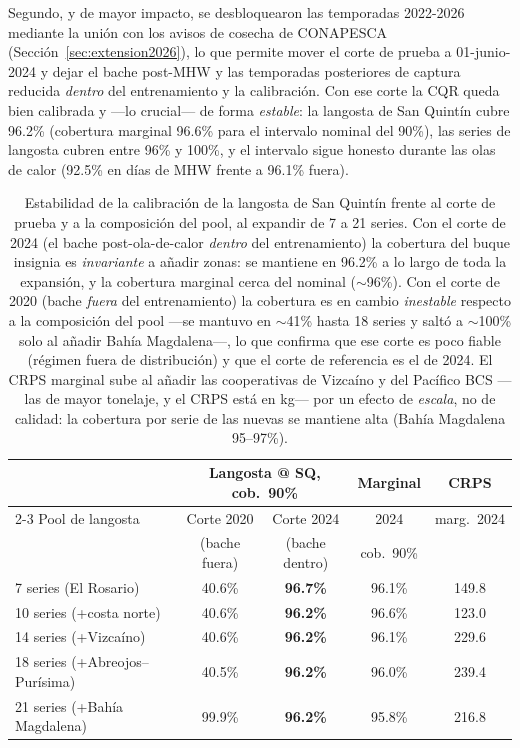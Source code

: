 \documentclass[twoside,11pt]{article}
\begin{document}
Segundo, y de mayor impacto, se desbloquearon las temporadas 2022-2026 mediante la unión con los avisos de cosecha de CONAPESCA (Sección~\ref{sec:extension2026}), lo que permite mover el corte de prueba a 01-junio-2024 y dejar el bache post-MHW y las temporadas posteriores de captura reducida \emph{dentro} del entrenamiento y la calibración. Con ese corte la CQR queda bien calibrada y ---lo crucial--- de forma \emph{estable}: la langosta de San Quintín cubre 96.2\% (cobertura marginal 96.6\% para el intervalo nominal del 90\%), las series de langosta cubren entre 96\% y 100\%, y el intervalo sigue honesto durante las olas de calor (92.5\% en días de MHW frente a 96.1\% fuera).

\begin{table}[htbp]
\centering
\small
\begin{tabular}{p{4.6cm}cccc}
\toprule
 & \multicolumn{2}{c}{Langosta @ SQ, cob.\ 90\%} & Marginal & CRPS \\
\cmidrule(lr){2-3}
Pool de langosta & Corte 2020 & Corte 2024 & 2024 & marg.\ 2024 \\
 & (bache fuera) & (bache dentro) & cob.\ 90\% & \\
\midrule
7 series (El Rosario) & 40.6\% & \textbf{96.7\%} & 96.1\% & 149.8 \\
10 series (+costa norte) & 40.6\% & \textbf{96.2\%} & 96.6\% & 123.0 \\
14 series (+Vizcaíno) & 40.6\% & \textbf{96.2\%} & 96.1\% & 229.6 \\
18 series (+Abreojos--Purísima) & 40.5\% & \textbf{96.2\%} & 96.0\% & 239.4 \\
21 series (+Bahía Magdalena) & 99.9\% & \textbf{96.2\%} & 95.8\% & 216.8 \\
\bottomrule
\end{tabular}
\caption{Estabilidad de la calibración de la langosta de San Quintín frente al corte de prueba y a la composición del pool, al expandir de 7 a 21 series. Con el corte de 2024 (el bache post-ola-de-calor \emph{dentro} del entrenamiento) la cobertura del buque insignia es \emph{invariante} a añadir zonas: se mantiene en 96.2\% a lo largo de toda la expansión, y la cobertura marginal cerca del nominal ($\sim$96\%). Con el corte de 2020 (bache \emph{fuera} del entrenamiento) la cobertura es en cambio \emph{inestable} respecto a la composición del pool ---se mantuvo en $\sim$41\% hasta 18 series y saltó a $\sim$100\% solo al añadir Bahía Magdalena---, lo que confirma que ese corte es poco fiable (régimen fuera de distribución) y que el corte de referencia es el de 2024. El CRPS marginal sube al añadir las cooperativas de Vizcaíno y del Pacífico BCS ---las de mayor tonelaje, y el CRPS está en kg--- por un efecto de \emph{escala}, no de calidad: la cobertura por serie de las nuevas se mantiene alta (Bahía Magdalena 95--97\%).}
\label{tab:extension_moredata}
\end{table}
\end{document}

